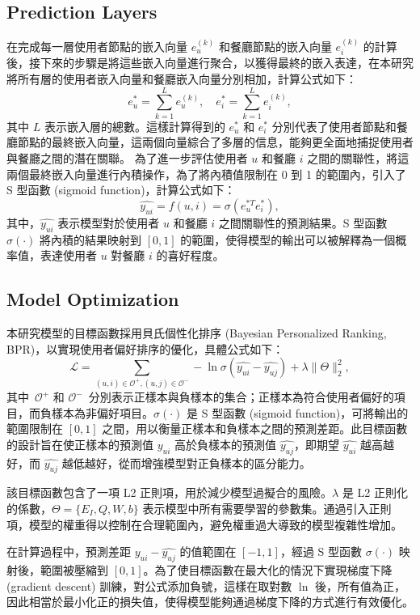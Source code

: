 \subsection{Prediction Layers}
    在完成每一層使用者節點的嵌入向量 $e_u^{(k)}$ 和餐廳節點的嵌入向量 $e_i^{(k)}$ 的計算後，接下來的步驟是將這些嵌入向量進行聚合，以獲得最終的嵌入表達，在本研究將所有層的使用者嵌入向量和餐廳嵌入向量分別相加，計算公式如下： 
    \begin{equation} 
        e_u^* = \sum_{k=1}^{L} e_u^{(k)}, \quad e_i^* = \sum_{k=1}^{L} e_i^{(k)}, 
    \end{equation} 
    其中 $L$ 表示嵌入層的總數。這樣計算得到的 $e_u^*$ 和 $e_i^*$ 分別代表了使用者節點和餐廳節點的最終嵌入向量，這兩個向量綜合了多層的信息，能夠更全面地捕捉使用者與餐廳之間的潛在關聯。
    為了進一步評估使用者 $u$ 和餐廳 $i$ 之間的關聯性，將這兩個最終嵌入向量進行內積操作，為了將內積值限制在 0 到 1 的範圍內，引入了 S 型函數 (sigmoid function)，計算公式如下： 
    \begin{equation} 
        \hat{y_{ui}} = f(u, i) = \sigma(e_u^{*T} e_i^*), 
    \end{equation} 
    其中，$\hat{y_{ui}}$ 表示模型對於使用者 $u$ 和餐廳 $i$ 之間關聯性的預測結果。S 型函數 $\sigma(\cdot)$ 將內積的結果映射到 $[0, 1]$ 的範圍，使得模型的輸出可以被解釋為一個概率值，表達使用者 $u$ 對餐廳 $i$ 的喜好程度。

\subsection{Model Optimization}
    本研究模型的目標函數採用貝氏個性化排序 (Bayesian Personalized Ranking, BPR)，以實現使用者偏好排序的優化，具體公式如下：
    \begin{equation}
        \mathcal{L} = \sum_{(u, i) \in \mathcal{O^+}, (u, j) \in \mathcal{O^-}} -\ln\sigma(\hat{y_{ui}} - \hat{y_{uj}}) + \lambda\lVert \Theta \rVert_2^2,
    \end{equation}
    其中~$\mathcal{O^+}$ 和 $\mathcal{O^-}$~分別表示正樣本與負樣本的集合；正樣本為符合使用者偏好的項目，而負樣本為非偏好項目。$\sigma(\cdot)$ 是 S 型函數 (sigmoid function)，可將輸出的範圍限制在 $[0, 1]$ 之間，用以衡量正樣本和負樣本之間的預測差距。此目標函數的設計旨在使正樣本的預測值 $\hat{y_{ui}}$ 高於負樣本的預測值 $\hat{y_{uj}}$，即期望 $\hat{y_{ui}}$ 越高越好，而 $\hat{y_{uj}}$ 越低越好，從而增強模型對正負樣本的區分能力。

    該目標函數包含了一項 L2 正則項，用於減少模型過擬合的風險。$\lambda$ 是 L2 正則化的係數，$\Theta = \{E_I, Q, W, b\}$ 表示模型中所有需要學習的參數集。通過引入正則項，模型的權重得以控制在合理範圍內，避免權重過大導致的模型複雜性增加。

    在計算過程中，預測差距 $\hat{y_{ui}} - \hat{y_{uj}}$ 的值範圍在 $[-1, 1]$，經過 S 型函數 $\sigma(\cdot)$ 映射後，範圍被壓縮到 $[0, 1]$。為了使目標函數在最大化的情況下實現梯度下降 (gradient descent) 訓練，對公式添加負號，這樣在取對數 $\ln$ 後，所有值為正，因此相當於最小化正的損失值，使得模型能夠通過梯度下降的方式進行有效優化。
